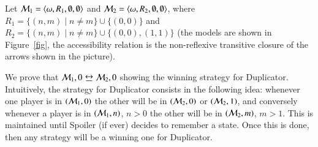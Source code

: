 \begin{pf}
Let $\mathcal{M}_1=\langle \omega,R_1,\emptyset,\emptyset \rangle$ and
$\mathcal{M}_2=\langle \omega,R_2,\emptyset,\emptyset \rangle$, where $R_1=\{(n,m)
\mid n\not= m\} \cup \{(0,0)\}$ and $R_2=\{(n,m) \mid n\not= m\}
\cup \{(0,0),(1,1)\}$ (the models are shown in Figure~\ref{fig}, the
accessibility relation is the non-reflexive transitive closure of the arrows shown
in the picture).

%
%
%
%
%
%
%
%

We prove that $\model_1,0\bisim\model_2,0$ showing the winning
strategy for Duplicator. Intuitively, the strategy for Duplicator
consists in the following idea: whenever one player is in
$(\mathcal{M}_1,0)$ the other will be in $(\mathcal{M}_2,0)$ or
$(\mathcal{M}_2,1)$, and conversely whenever a player is in
$(\mathcal{M}_1,n)$, $n>0$ the other will be in $(\mathcal{M}_2,m)$, $m>1$.
This is maintained until Spoiler (if ever) decides to remember a
state. Once this is done, then any strategy will be a winning one
for Duplicator.



\end{pf}

